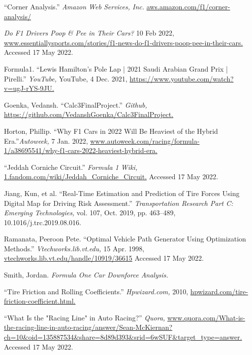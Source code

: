 \documentclass{article}
\begin{document}
\newpage
\begin{thebibliography}{9}
\label{sec:bib}

``Corner Analysis.'' \textit{Amazon Web Services, Inc.} \url{aws.amazon.com/f1/corner-analysis/}

\textit{Do F1 Drivers Poop & Pee in Their Cars?} 10 Feb 2022, \url{www.essentiallysports.com/stories/f1-news-do-f1-drivers-poop-pee-in-their-cars.} Accessed 17 May 2022.

Formula1. ``Lewis Hamilton's Pole Lap | 2021 Saudi Arabian Grand Prix | Pirelli.'' \textit{YouTube,} YouTube, 4 Dec. 2021, \url{https://www.youtube.com/watch?v=ugJ-rYS-9JU.}

Goenka, Vedansh. ``Calc3FinalProject.'' \textit{Github,} \url{https://github.com/VedanshGoenka/Calc3FinalProject.}

Horton, Phillip. ``Why F1 Cars in 2022 Will Be Heaviest of the Hybrid Era.''\textit{Autoweek,} 7 Jan. 2022, \url{www.autoweek.com/racing/formula-1/a38695541/why-f1-cars-2022-heaviest-hybrid-era.}

``Jeddah Corniche Circuit.'' \textit{Formula 1 Wiki,} \url{1.fandom.com/wiki/Jeddah_Corniche_Circuit.} Accessed 17 May 2022.

Jiang, Kun, et al. ``Real-Time Estimation and Prediction of Tire Forces Using Digital Map for Driving Risk Assessment.'' \textit{Transportation Research Part C: Emerging Technologies,} vol. 107, Oct. 2019, pp. 463–489, 10.1016/j.trc.2019.08.016.

Ramanata, Peeroon Pete. ``Optimal Vehicle Path Generator Using Optimization Methods.'' \textit{Vtechworks.lib.vt.edu,} 15 Apr. 1998, \url{vtechworks.lib.vt.edu/handle/10919/36615} Accessed 17 May 2022.

Smith, Jordan. \textit{Formula One Car Downforce Analysis.}

``Tire Friction and Rolling Coefficients.'' \textit{Hpwizard.com,} 2010, \url{hpwizard.com/tire-friction-coefficient.html.}

``What Is the "Racing Line" in Auto Racing?'' \textit{Quora,} \url{www.quora.com/What-is-the-racing-line-in-auto-racing/answer/Sean-McKiernan?ch=10&oid=135887534&share=8d89d393&srid=6wSUF&target_type=answer.} Accessed 17 May 2022.

\end{thebibliography}
\end{document}
